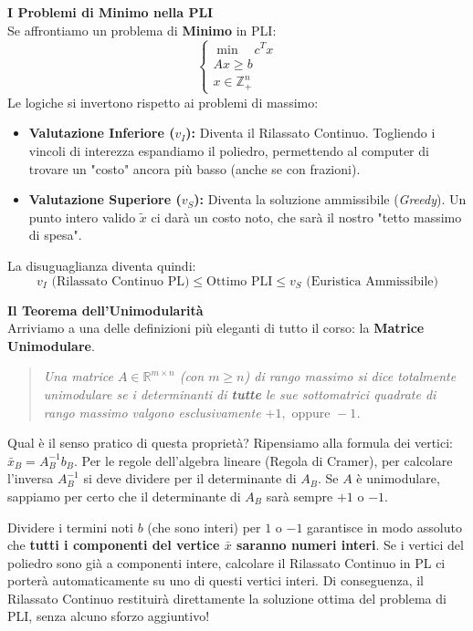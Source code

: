 \documentclass[12pt, a4paper]{article}
\begin{document}
	\textbf{I Problemi di Minimo nella PLI}\\
	Se affrontiamo un problema di \textbf{Minimo} in PLI:
	\[
	\begin{cases}
		\min \quad c^T x \\
		Ax \geq b \\
		x \in \mathbb{Z}^n_+
	\end{cases}
	\]
	Le logiche si invertono rispetto ai problemi di massimo:
	\begin{itemize}[label=\textcolor{titlecolor}{\Large\textbullet}, itemsep=2pt, leftmargin=1.5cm]
		\item \textbf{Valutazione Inferiore ($v_I$):} Diventa il Rilassato Continuo. Togliendo i vincoli di interezza espandiamo il poliedro, permettendo al computer di trovare un "costo" ancora più basso (anche se con frazioni).
		\item \textbf{Valutazione Superiore ($v_S$):} Diventa la soluzione ammissibile (\textit{Greedy}). Un punto intero valido $\tilde{x}$ ci darà un costo noto, che sarà il nostro "tetto massimo di spesa".
	\end{itemize}
	La disuguaglianza diventa quindi:
	\[
	v_I \text{ (Rilassato Continuo PL)} \leq \text{Ottimo PLI} \leq v_S \text{ (Euristica Ammissibile)}
	\]
	
	\vspace{0.4cm}
	\textbf{Il Teorema dell'Unimodularità}\\
	Arriviamo a una delle definizioni più eleganti di tutto il corso: la \textbf{Matrice Unimodulare}.
	\begin{quote}
		\textit{Una matrice $A \in \mathbb{R}^{m \times n}$ (con $m \geq n$) di rango massimo si dice totalmente unimodulare se i determinanti di \textbf{tutte} le sue sottomatrici quadrate di rango massimo valgono esclusivamente $+1, \text{ oppure } -1$.}
	\end{quote}
	
	Qual è il senso pratico di questa proprietà? Ripensiamo alla formula dei vertici: $\bar{x}_B = A_B^{-1} b_B$. 
	Per le regole dell'algebra lineare (Regola di Cramer), per calcolare l'inversa $A_B^{-1}$ si deve dividere per il determinante di $A_B$. Se $A$ è unimodulare, sappiamo per certo che il determinante di $A_B$ sarà sempre $+1$ o $-1$. 
	
	Dividere i termini noti $b$ (che sono interi) per $1$ o $-1$ garantisce in modo assoluto che \textbf{tutti i componenti del vertice $\bar{x}$ saranno numeri interi}.
	Se i vertici del poliedro sono già a componenti intere, calcolare il Rilassato Continuo in PL ci porterà automaticamente su uno di questi vertici interi. Di conseguenza, il Rilassato Continuo restituirà direttamente la soluzione ottima del problema di PLI, senza alcuno sforzo aggiuntivo!
	
\end{document}
